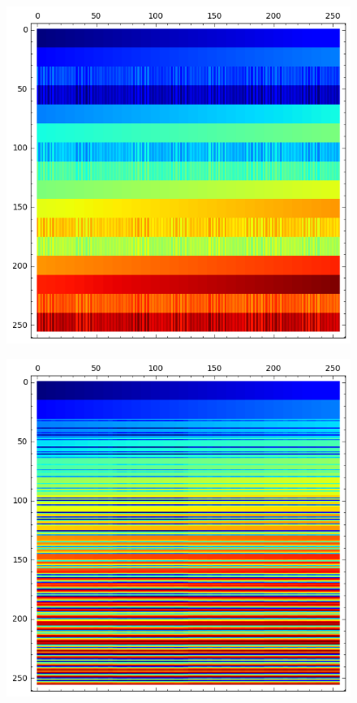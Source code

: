 \documentclass[12pt,a4paper]{article}
\begin{document}
\begin{figure}[!ht]
\centering
\begin{minipage}{.48\textwidth}
  \centering
\includegraphics[width=.9\linewidth]{../matrix_plot/cast128_7_15_bent_cayley_graph_index_matrix.png}
  \label{fig:cast128_7_15_bent_cayley_graph_index_matrix}
\end{minipage}%
\begin{minipage}{.48\textwidth}
  \centering
\includegraphics[width=.9\linewidth]{../matrix_plot/cast128_7_21_bent_cayley_graph_index_matrix.png}

\end{minipage}
\end{figure}
\end{document}
